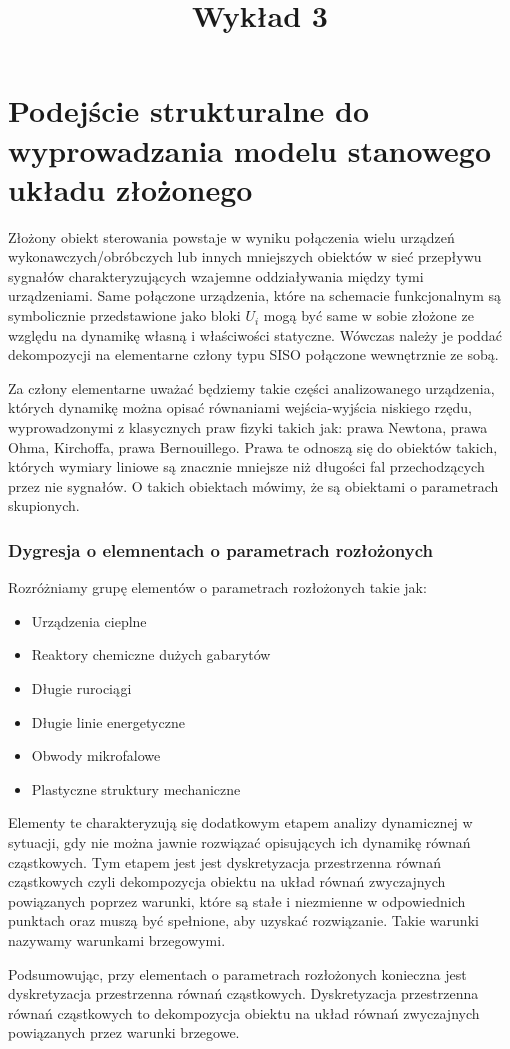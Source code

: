 \documentclass{article}
\title{Wykład 3}
\begin{document}
	\section{Podejście strukturalne do wyprowadzania modelu stanowego układu złożonego}

		Złożony obiekt sterowania powstaje w wyniku połączenia wielu urządzeń wykonawczych/obróbczych lub
		innych mniejszych obiektów  w sieć przepływu sygnałów charakteryzujących wzajemne
		oddziaływania między tymi urządzeniami.
		Same połączone urządzenia, które na schemacie funkcjonalnym są
		symbolicznie przedstawione jako bloki $U_i$ mogą być same w sobie złożone ze względu na
		dynamikę własną i właściwości statyczne. Wówczas należy je poddać dekompozycji na
		elementarne człony typu SISO połączone wewnętrznie ze sobą.
		
		Za człony elementarne uważać będziemy takie części analizowanego urządzenia, których
		dynamikę można opisać równaniami wejścia-wyjścia niskiego rzędu,
		wyprowadzonymi z klasycznych praw fizyki takich jak: prawa Newtona, prawa Ohma,
		Kirchoffa, prawa Bernouillego. Prawa te odnoszą się do obiektów
		takich, których wymiary liniowe są znacznie mniejsze niż długości fal
		przechodzących przez nie sygnałów. O takich obiektach mówimy, że są obiektami
		o parametrach skupionych.
		\subsubsection{Dygresja o elemnentach o parametrach rozłożonych}
			Rozróżniamy grupę elementów o parametrach rozłożonych takie jak:
			\begin{itemize}
				\item Urządzenia cieplne 
				\item Reaktory chemiczne dużych gabarytów
				\item Długie rurociągi
				\item Długie linie energetyczne
				\item Obwody mikrofalowe
				\item Plastyczne struktury mechaniczne
			\end{itemize}

			Elementy te charakteryzują się dodatkowym etapem analizy dynamicznej
			w sytuacji, gdy nie można jawnie rozwiązać opisujących ich dynamikę równań cząstkowych.
			Tym etapem jest jest dyskretyzacja przestrzenna równań cząstkowych czyli dekompozycja obiektu na układ równań
			zwyczajnych powiązanych poprzez warunki, które są stałe i niezmienne w odpowiednich punktach
			oraz muszą być spełnione, aby uzyskać rozwiązanie. Takie warunki nazywamy warunkami brzegowymi.

			Podsumowując, przy elementach o parametrach rozłożonych konieczna jest dyskretyzacja przestrzenna równań
			cząstkowych. Dyskretyzacja przestrzenna równań cząstkowych to dekompozycja obiektu na układ równań zwyczajnych
			powiązanych przez warunki brzegowe.
\end{document}
